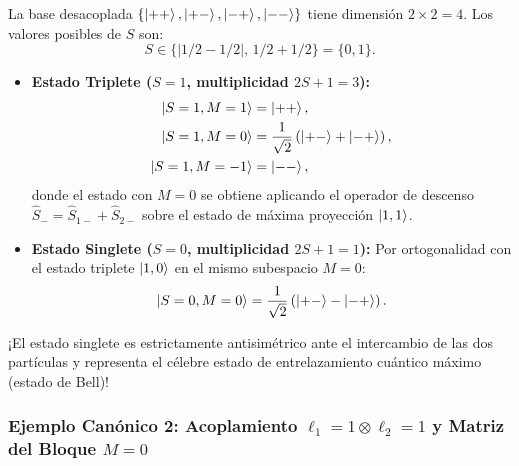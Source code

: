 La base desacoplada $\{\left| ++ \right\rangle, \left| +- \right\rangle, \left| -+ \right\rangle, \left| -- \right\rangle\}$ tiene dimensión $2\times 2 = 4$. Los valores posibles de $S$ son:
\begin{equation}
    S \in \{|1/2 - 1/2|, \, 1/2 + 1/2\} = \{0, 1\}.
\end{equation}
\begin{itemize}
    \item \textbf{Estado Triplete ($S = 1$, multiplicidad $2S+1 = 3$):}
    \begin{align}
        \left| S=1, M=1 \right\rangle &= \left| ++ \right\rangle, \\
        \left| S=1, M=0 \right\rangle &= \frac{1}{\sqrt{2}}\left( \left| +- \right\rangle + \left| -+ \right\rangle \right), \\
        \left| S=1, M=-1 \right\rangle &= \left| -- \right\rangle,
    \end{align}
    donde el estado con $M = 0$ se obtiene aplicando el operador de descenso $\hat{S}_- = \hat{S}_{1-} + \hat{S}_{2-}$ sobre el estado de máxima proyección $\left| 1, 1 \right\rangle$.
    \item \textbf{Estado Singlete ($S = 0$, multiplicidad $2S+1 = 1$):}
    Por ortogonalidad con el estado triplete $\left| 1, 0 \right\rangle$ en el mismo subespacio $M = 0$:
    \begin{equation}
        \left| S=0, M=0 \right\rangle = \frac{1}{\sqrt{2}}\left( \left| +- \right\rangle - \left| -+ \right\rangle \right).
    \end{equation}
\end{itemize}
¡El estado singlete es estrictamente antisimétrico ante el intercambio de las dos partículas y representa el célebre estado de entrelazamiento cuántico máximo (estado de Bell)!

\subsubsection{Ejemplo Canónico 2: Acoplamiento \texorpdfstring{$\ell_1 = 1 \otimes \ell_2 = 1$}{l1=1 x l2=1} y Matriz del Bloque \texorpdfstring{$M = 0$}{M=0}}

